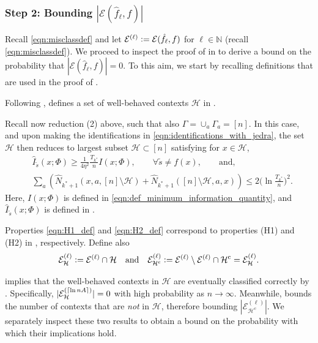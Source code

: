 \documentclass[11pt]{article}
\newcommand{\eqdef}{\vcentcolon=}
\newcommand{\mcE}{\mathcal{E}}
\newcommand{\mcH}{\mathcal{H}}
\newcommand{\mbbN}{\mathbb{N}}
\DeclarePairedDelimiter\ceil{\lceil}{\rceil}
\theoremstyle{definition}
\theoremstyle{definition}
\begin{document}
\subsubsection*{Step 2: Bounding $|\mcE(\hat{f}_{\ell},f)|$}

Recall \eqref{eqn:misclassdef} and let $\mcE^{(\ell)}\eqdef \mcE(\hat{f}_{\ell},f)$ for $\ell\in\mbbN$ (recall \eqref{eqn:misclassdef}).
We proceed to inspect the proof of \cite[Theorem 3]{Jedra:2022} in \cite[Appendix G]{Jedra:2022} to derive a bound on the probability that $|\mcE(\hat{f}_{\ell},f)|=0$.
To this aim, we start by recalling definitions that are used in the proof of \cite[Theorem 3]{Jedra:2022}.

Following \cite{yun2016optimal,Sanders:2020}, \cite{Jedra:2022} defines a set of well-behaved contexts $\mcH$ in \cite[Definition 8]{Jedra:2022}.

Recall now reduction (2) above, such that also $\Gamma =\cup_{a}\Gamma_a=[n]$.
In this case, and upon making the identifications in \eqref{eqn:identifications_with_jedra}, the set $\mcH$ then reduces to largest subset $\mcH\subset [n]$ satisfying for $x\in\mcH$,
\begin{align}
	 &
	\hat{I}_{\tilde{s}}(x;\Phi)\geq \frac{1}{4\eta^2}\frac{T_{k^*}}{n}I(x;\Phi),
	\qquad
	\forall \tilde{s}\neq f(x),
	\qquad
	\mathrm{and},
	\label{eqn:H1_def}
	\\
	 &
	\sum_{a}
	(\hat{N}_{k^*+1}(x,a,[n]\setminus\mcH)+\hat{N}_{k^*+1}([n]\setminus\mcH,a,x))\leq 2\biggl(\ln\frac{T_{k^*}}{n}\biggr)^2
	.
	\label{eqn:H2_def}
\end{align}
Here, $I(x;\Phi)$ is defined in \eqref{eqn:def_minimum_information_quantity}, and $\hat{I}_{\tilde{s}}(x;\Phi)$ is defined in \cite[(78)]{Jedra:2022}.

Properties \eqref{eqn:H1_def} and \eqref{eqn:H2_def} correspond to properties (H1) and (H2) in \cite[(79)--(80)]{Jedra:2022}, respectively.
Define also
\begin{equation}
	\mcE^{(\ell)}_{\mcH}\eqdef \mcE^{(\ell)}\cap\mcH
	\quad
	\mathrm{and}
	\quad
	\mcE^{(\ell)}_{\mcH^{\mathrm{c}}}\eqdef \mcE^{(\ell)}\setminus \mcE^{{(\ell)}}\cap\mcH^{\mathrm{c}}=\mcE^{(\ell)}_{\mcH}.
\end{equation}

\cite[Proposition 21]{Jedra:2022} implies that the well-behaved contexts in $\mcH$ are eventually classified correctly by .
Specifically, $|\mcE^{(\ceil{\ln nA})}_{\mcH}|=0$ with high probability as $n\rightarrow \infty$.
Meanwhile, \cite[Proposition 20]{Jedra:2022} bounds the number of contexts that are \textit{not} in $\mcH$, therefore bounding $|\mcE^{(\ell)}_{\mcH^{\mathrm{c}}}|$.
We separately inspect these two results to obtain a bound on the probability with which their implications hold.
\end{document}
